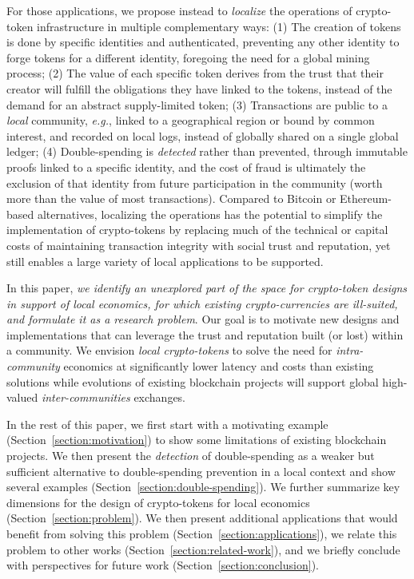 \documentclass[sigconf,9pt]{acmart}
\begin{document}
For those applications, we propose instead to \textit{localize} the operations of crypto-token infrastructure in multiple complementary ways: (1) The creation of tokens is done by specific identities and authenticated, preventing any other identity to forge tokens for a different identity, foregoing the need for a global mining process; (2) The value of each specific token derives from the trust that their creator will fulfill the obligations they have linked to the tokens, instead of the demand for an abstract supply-limited token; (3) Transactions are public to a \textit{local} community, \textit{e.g.}, linked to a geographical region or bound by common interest, and recorded on local logs, instead of globally shared on a single global ledger; (4) Double-spending is \textit{detected} rather than prevented, through immutable proofs linked to a specific identity, and the cost of fraud is ultimately the exclusion of that identity from future participation in the community (worth more than the value of most transactions). Compared to Bitcoin or Ethereum-based alternatives, localizing the operations has the potential to simplify the implementation of crypto-tokens by replacing much of the technical or capital costs of maintaining transaction integrity with social trust and reputation, yet still enables a large variety of local applications to be supported.

In this paper, \textit{we identify an unexplored part of the space for crypto-token designs in support of local economics, for which existing crypto-currencies are ill-suited, and formulate it as a research problem}. Our goal is to motivate new designs and implementations that can leverage the trust and reputation built (or lost) within a community. We envision \textit{local crypto-tokens} to solve the need for \textit{intra-community} economics at significantly lower latency and costs than existing solutions while evolutions of existing blockchain projects will support global high-valued \textit{inter-communities} exchanges.

In the rest of this paper, we first start with a motivating example (Section~\ref{section:motivation}) to show some limitations of existing blockchain projects. We then present the \textit{detection} of double-spending as a weaker but sufficient alternative to double-spending prevention in a local context and show several examples (Section~\ref{section:double-spending}). We further summarize key dimensions for the design of crypto-tokens for local economics (Section~\ref{section:problem}). We then present additional applications that would benefit from solving this problem (Section~\ref{section:applications}), we relate this problem to other works (Section~\ref{section:related-work}), and we briefly conclude with perspectives for future work (Section~\ref{section:conclusion}).
\end{document}
